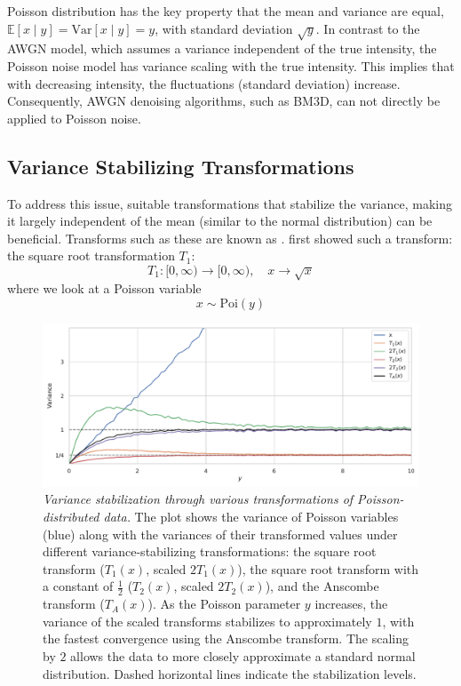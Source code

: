 Poisson distribution has the key property that the mean and variance are equal, $\mathbb{E}[x\mid y] = \text{Var}[x\mid y] = y$, with standard deviation $\sqrt{y}$. In contrast to the \gls{AWGN} model, which assumes a variance independent of the true intensity, the Poisson noise model has variance scaling with the true intensity. This implies that with decreasing intensity, the fluctuations (standard deviation) increase. Consequently, \gls{AWGN} denoising algorithms, such as \gls{BM3D}, can not directly be applied to Poisson noise.

\subsection{Variance Stabilizing Transformations}
To address this issue, suitable transformations that stabilize the variance, making it largely independent of the mean (similar to the normal distribution) can be beneficial. Transforms such as these are known as . \citeauthor{bartlettSquareRootTransformation1936} \cite{bartlettSquareRootTransformation1936} first showed such a transform: the square root transformation $T_1$:
\begin{equation}
    T_1: [0, \infty) \to [0, \infty), \quad x \to \sqrt{x}
\end{equation}
where we look at a Poisson variable
\begin{equation}\label{eq:poisson-pmf-2}
    x \sim \text{Poi}(y)
\end{equation}

\begin{figure}
    \centering
    \includegraphics[width=1\linewidth]{images/data_transform_anscombe.pdf}
    \caption{\textit{Variance stabilization through various transformations of Poisson-distributed data.} The plot shows the variance of Poisson variables (blue) along with the variances of their transformed values under different variance-stabilizing transformations: the square root transform ($T_1(x)$, scaled $2T_1(x)$), the square root transform with a constant of $\frac{1}{2}$ ($T_2(x)$, scaled $2T_2(x)$), and the Anscombe transform ($T_A(x)$). 
    As the Poisson parameter $y$ increases, the variance of the scaled transforms stabilizes to approximately $1$, with the fastest convergence using the Anscombe transform.
    The scaling by $2$ allows the data to more closely approximate a standard normal distribution. Dashed horizontal lines indicate the stabilization levels.}
    \label{fig:data-transform-anscombe}
\end{figure}

